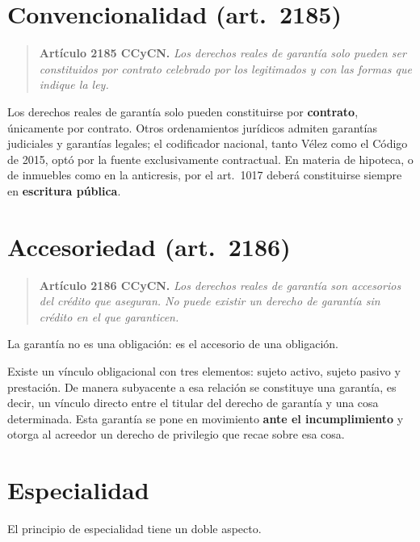 \documentclass[12pt,oneside]{book}
\begin{document}
\section{Convencionalidad (art.~2185)}

\begin{quote}
\textbf{Artículo 2185 CCyCN.} \textit{Los derechos reales de garantía solo pueden ser constituidos por contrato celebrado por los legitimados y con las formas que indique la ley.}
\end{quote}

Los derechos reales de garantía solo pueden constituirse por \textbf{contrato}, únicamente por contrato. Otros ordenamientos jurídicos admiten garantías judiciales y garantías legales; el codificador nacional, tanto Vélez como el Código de 2015, optó por la fuente exclusivamente contractual. En materia de hipoteca, o de inmuebles como en la anticresis, por el art.~1017 deberá constituirse siempre en \textbf{escritura pública}.

\section{Accesoriedad (art.~2186)}

\begin{quote}
\textbf{Artículo 2186 CCyCN.} \textit{Los derechos reales de garantía son accesorios del crédito que aseguran. No puede existir un derecho de garantía sin crédito en el que garanticen.}
\end{quote}

\begin{importante}
La garantía no es una obligación: es el accesorio de una obligación.
\end{importante}

Existe un vínculo obligacional con tres elementos: sujeto activo, sujeto pasivo y prestación. De manera subyacente a esa relación se constituye una garantía, es decir, un vínculo directo entre el titular del derecho de garantía y una cosa determinada. Esta garantía se pone en movimiento \textbf{ante el incumplimiento} y otorga al acreedor un derecho de privilegio que recae sobre esa cosa.

\section{Especialidad}

El principio de especialidad tiene un doble aspecto.
\end{document}
